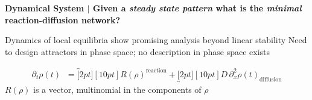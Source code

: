 \documentclass[a0,portrait]{a0poster}
\begin{document}
\begin{tcolorbox}[boxrule=2pt,arc=3.4pt,boxsep=2mm]
	\begin{center}
		\textbf{\color{Grey}Dynamical System \color{Black}$|$
		Given a \textit{steady state pattern} what is the \textit{minimal} reaction-diffusion network?}
	\end{center}
\end{tcolorbox}

\begin{itemize}[leftmargin=5cm]
	\up Dynamics of local equilibria show promising analysis beyond linear stability \cite{Halatek2018}
	\down Need to design attractors in phase space; no description in phase space exists
\end{itemize}

\begin{align*}
	\partial_t\rho(t)\;\;=
	\overbracket[2pt][10pt]{R(\rho)}^{\text{reaction}}+
	\underbracket[2pt][10pt]{D\,\partial_x^2\rho(t)}_{\text{diffusion}}
\end{align*}
$R(\rho)$ is a vector, multinomial in the components of $\rho$

\vfill\normalsize

\begin{minipage}[t][][b]{0.99\textwidth}
	
	
\end{minipage}
\end{document}

